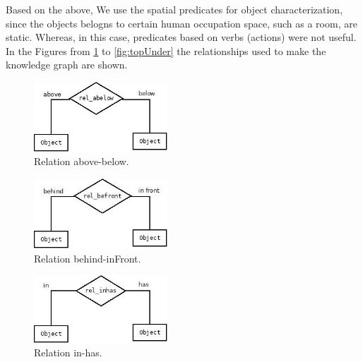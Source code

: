Based on the above, We use the spatial predicates for object characterization, 
since the objects belogns to certain human occupation space, 
such as a room, are static. Whereas, in this case, 
predicates based on verbs (actions) were not useful. In the Figures from 
\ref{fig:abelow} to \ref{fig:topUnder} the relationships used to make the 
knowledge graph are shown.

\begin{figure}[H]
    \centering
    \includegraphics[width=5cm]{figures/abelow.jpg}
    \caption{Relation above-below.}
    \label{fig:abelow}
\end{figure}

\begin{figure}[H]
    \centering
    \includegraphics[width=5cm]{figures/befront.jpg}
    \caption{Relation behind-inFront.}
    \label{fig:befront}
\end{figure}

\begin{figure}[H]
    \centering
    \includegraphics[width=5cm]{figures/inhas.jpg}
    \caption{Relation in-has.}
    \label{fig:inhas}
\end{figure}

